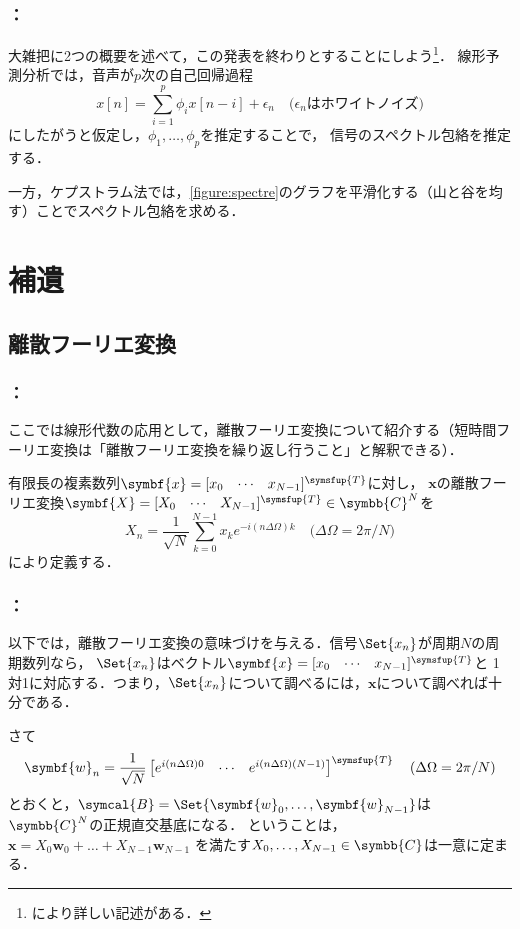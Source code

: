 \documentclass[unicode,11pt]{beamer}
\newcommand{\termdef}[1]{\alert{\sffamily #1}}
\newcommand{\impact}[1]{\alert{\sffamily #1}}
\newcommand{\numset}[1]{\symbb{#1}}
\newcommand{\trps}[1]{#1^{\symsfup{T}}}
\newcommand{\vb}[1]{\symbf{#1}}
\newcommand{\inlinevec}[1]{[\smash{\begin{matrix}#1\end{matrix}}]}
\newcommand{\basis}[1]{\symcal{#1}}
\begin{document}
\begin{frame}
  \frametitle{\secname ：\subsecname}
  大雑把に2つの概要を述べて，この発表を終わりとすることにしよう\footnote{\cite{takamichi2015,morise2018}により詳しい記述がある．}．
  線形予測分析では，音声が\(p\)次の\termdef{自己回帰過程}
  \[
    x[n] = \sum_{i=1}^p\phi_ix[n-i]+\epsilon_n
    \quad\text{(\(\epsilon_n\)はホワイトノイズ)}
  \]
  にしたがうと仮定し，\(\phi_1,\dots,\phi_p\)を推定することで，
  信号のスペクトル包絡を推定する．

  一方，ケプストラム法では，\cref{figure:spectre}のグラフを平滑化する（山と谷を均す）ことでスペクトル包絡を求める．
\end{frame}

\section{補遺}
\subsection{離散フーリエ変換}
\begin{frame}
  \frametitle{\secname ：\subsecname}
  \begin{block}{\subsecname}
    ここでは線形代数の応用として，離散フーリエ変換について紹介する（短時間フーリエ変換は「離散フーリエ変換を繰り返し行うこと」と解釈できる）．

    \begin{definition}
      有限長の複素数列\(\vb{x}=\trps{\inlinevec{x_0 & \cdots & x_{N-1}}}\)に対し，
      \(\vb{x}\)の\termdef{離散フーリエ変換}\(\vb{X}=\trps{\inlinevec{X_0 & \cdots & X_{N-1}}}\in\numset{C}^N\)を
      \[
        X_n = \frac{1}{\sqrt{N}}\sum_{k=0}^{N-1}x_ke^{-i(n\Delta\Omega)k}
        \quad\text{(\(\Delta\Omega=2\pi/N\))}
      \]
      により定義する．
    \end{definition}
  \end{block}
\end{frame}

\begin{frame}
  \frametitle{\secname ：\subsecname}
  以下では，離散フーリエ変換の意味づけを与える．信号\(\Set{x_n}\)が周期\(N\)の周期数列なら，
  \(\Set{x_n}\)はベクトル\(\vb{x}=\trps{\inlinevec{x_0 & \cdots & x_{N-1}}}\)と
  1対1に対応する．つまり，\(\Set{x_n}\)について調べるには，\(\vb{x}\)について調べれば十分である．

  さて
  \[
    \vb{w}_n = \frac{1}{\sqrt{N}}\trps{\begin{bmatrix}e^{i(n\Delta\Omega)0} & \cdots & e^{i(n\Delta\Omega)(N-1)}\end{bmatrix}}
    \quad\text{(\(\Delta\Omega=2\pi/N\))}
  \]
  とおくと，\impact{\(\basis{B}=\Set{\vb{w}_0,\dots,\vb{w}_{N-1}}\)は\(\numset{C}^N\)の正規直交基底になる}．
  ということは，\(\vb{x}=X_0\vb{w}_0+\dots+X_{N-1}\vb{w}_{N-1}\)
  を満たす\(X_0,\dots,X_{N-1}\in\numset{C}\)は一意に定まる．
\end{frame}
\end{document}
